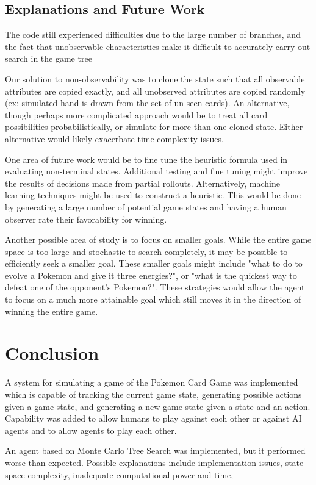 \documentclass{article}
\begin{document}
\subsection{Explanations and Future Work} %
The code still experienced difficulties due to the large number of branches, and the fact that unobservable characteristics make it difficult to accurately carry out search in the game tree

Our solution to non-observability was to clone the state such that all observable attributes are copied exactly, and all unobserved attributes are copied randomly (ex: simulated hand is drawn from the set of un-seen cards). An alternative, though perhaps more complicated approach would be to treat all card possibilities probabilistically, or simulate for more than one cloned state.  Either alternative would likely exacerbate time complexity issues.

One area of future work would be to fine tune the heuristic formula used in evaluating non-terminal states.  Additional testing and fine tuning might improve the results of decisions made from partial rollouts.  Alternatively, machine learning techniques might be used to construct a heuristic.  This would be done by generating a large number of potential game states and having a human observer rate their favorability for winning.

Another possible area of study is to focus on smaller goals.  While the entire game space is too large and stochastic to search completely, it may be possible to efficiently seek a smaller goal.  These smaller goals might include "what to do to evolve a Pokemon and give it three energies?", or "what is the quickest way to defeat one of the opponent's Pokemon?".  These strategies would allow the agent to focus on a much more attainable goal which still moves it in the direction of winning the entire game.

\section{Conclusion} %
A system for simulating a game of the Pokemon Card Game was implemented which is capable of tracking the current game state, generating possible actions given a game state, and generating a new game state given a state and an action. Capability was added to allow humans to play against each other or against AI agents and to allow agents to play each other. 

An agent based on Monte Carlo Tree Search was implemented, but it performed worse than expected. Possible explanations include implementation issues, state space complexity, inadequate computational power and time, 
\end{document}
